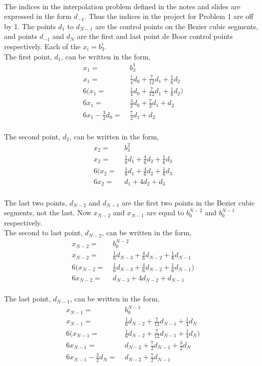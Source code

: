 \documentclass[12pt]{article}
\begin{document}
\\

The indices in the interpolation problem defined in the notes and slides are expressed in the form $d_{-1}$. Thus the indices in the project for Problem 1 are off by 1. The points $d_1$ to $d_{N-1}$ are the control points on the Bezier cubic segments, and points $d_{-1}$ and $d_{N}$ are the first and last point de Boor control points respectively. Each of the $x_i = b^{i}_{3}$. \\

The first point, $d_1$, can be written in the form, 
\begin{align*}
x_1 =&\; b^{1}_{3} \\
x_1  =&\; \frac{1}{4}d_0 +\frac{7}{12}d_1 + \frac{1}{6}d_2 \\
6(x_1  =&\; \frac{1}{4}d_0 +\frac{7}{12}d_1 + \frac{1}{6}d_2) \\
6x_1  =&\;  \frac{3}{2}d_0 +\frac{7}{2}d_1 + d_2 \\
6x_1  - \frac{3}{2}d_0  =&\; \frac{7}{2}d_1 + d_2 \\
\end{align*}

The second point, $d_2$, can be written in the form,
\begin{align*}
x_2 =&\; b^{2}_{3} \\
x_2  =&\; \frac{1}{6}d_1 +\frac{4}{6}d_2 + \frac{1}{6}d_3 \\
6(x_2  =&\; \frac{1}{6}d_1 +\frac{4}{6}d_2 + \frac{1}{6}d_3 \\
6x_2  =&\;  d_1 + 4d_2 + d_3 \\
\end{align*}

The last two points, $d_{N-2}$ and $d_{N-1}$ are the first two points in the Bezier cubic segments, not the last. Now $x_{N-2}$ and $x_{N-1}$ are equal to $b^{N-2}_{0}$ and $b^{N-1}_{0}$ respectively.\\

The second to last point, $d_{N-2}$, can be written in the form, 
\begin{align*}
x_{N-2} =&\; b^{N-2}_{0} \\
x_{N-2} =&\; \frac{1}{6}d_{N-3} +\frac{4}{6}d_{N-2} + \frac{1}{6}d_{N-1} \\
6(x_{N-2} =&\; \frac{1}{6}d_{N-3} +\frac{4}{6}d_{N-2} + \frac{1}{6}d_{N-1}) \\
6x_{N-2} =&\; d_{N-3} + 4d_{N-2} + d_{N-1} \\
\end{align*}

The last point, $d_{N-1}$, can be written in the form, 
\begin{align*}
x_{N-1} =&\; b^{N-1}_{0} \\
x_{N-1} =&\; \frac{1}{6}d_{N-2}+\frac{7}{12}d_{N-1} + \frac{1}{4}d_N \\
6(x_{N-1} =&\; \frac{1}{6}d_{N-2}+\frac{7}{12}d_{N-1} + \frac{1}{4}d_N) \\
6x_{N-1} =&\; d_{N-2}+\frac{7}{2}d_{N-1} + \frac{3}{2}d_N \\
6x_{N-1} - \frac{3}{2}d_N =&\; d_{N-2}+\frac{7}{2}d_{N-1} \\
\end{align*}
\end{document}
